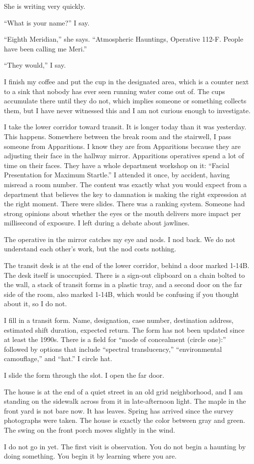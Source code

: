 She is writing very quickly.

``What is your name?'' I say.

``Eighth Meridian,'' she says. ``Atmospheric Hauntings, Operative 112-F. People have been calling me Meri.''

``They would,'' I say.

I finish my coffee and put the cup in the designated area, which is a counter next to a sink that nobody has ever seen running water come out of. The cups accumulate there until they do not, which implies someone or something collects them, but I have never witnessed this and I am not curious enough to investigate.

I take the lower corridor toward transit. It is longer today than it was yesterday. This happens. Somewhere between the break room and the stairwell, I pass someone from Apparitions. I know they are from Apparitions because they are adjusting their face in the hallway mirror. Apparitions operatives spend a lot of time on their faces. They have a whole department workshop on it: ``Facial Presentation for Maximum Startle.'' I attended it once, by accident, having misread a room number. The content was exactly what you would expect from a department that believes the key to damnation is making the right expression at the right moment. There were slides. There was a ranking system. Someone had strong opinions about whether the eyes or the mouth delivers more impact per millisecond of exposure. I left during a debate about jawlines.

The operative in the mirror catches my eye and nods. I nod back. We do not understand each other's work, but the nod costs nothing.

The transit desk is at the end of the lower corridor, behind a door marked 1-14B. The desk itself is unoccupied. There is a sign-out clipboard on a chain bolted to the wall, a stack of transit forms in a plastic tray, and a second door on the far side of the room, also marked 1-14B, which would be confusing if you thought about it, so I do not.

I fill in a transit form. Name, designation, case number, destination address, estimated shift duration, expected return. The form has not been updated since at least the 1990s. There is a field for ``mode of concealment (circle one):'' followed by options that include ``spectral translucency,'' ``environmental camouflage,'' and ``hat.'' I circle hat.

I slide the form through the slot. I open the far door.

The house is at the end of a quiet street in an old grid neighborhood, and I am standing on the sidewalk across from it in late-afternoon light. The maple in the front yard is not bare now. It has leaves. Spring has arrived since the survey photographs were taken. The house is exactly the color between gray and green. The swing on the front porch moves slightly in the wind.

I do not go in yet. The first visit is observation. You do not begin a haunting by doing something. You begin it by learning where you are.
